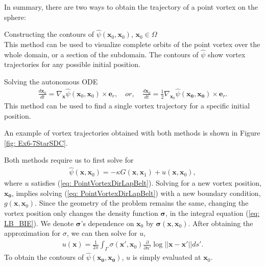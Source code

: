 \documentclass{sfuthesis}
\newcounter{qcounter}
\begin{document}
In summary, there are two ways to obtain the trajectory of a point vortex on the sphere: 
\begin{list}{\bfseries{} Method :~}{}
\item Constructing the contours of $\hat{\psi}(\mathbf{x}_0,\mathbf{x}_0)$, $\mathbf{x}_0 \in \Omega$ \\
This method can be used to visualize complete orbits of the point vortex over the whole domain, or a section of the subdomain. The contours of $\hat{\psi}$ show vortex trajectories for any possible initial position. 
\item Solving the autonomous ODE
\begin{align}
	\frac{d\mathbf{x}_0}{dt}={\nabla}_\mathbf{x}\hat{\psi}(\mathbf{x}_0,\mathbf{x}_0) \times {\mathbf{e}}_r, \quad or, \quad \frac{d\mathbf{x}_0}{dt}=\frac{1}{2}{\nabla}_{\mathbf{x}_0}\hat{\psi}(\mathbf{x_0},\mathbf{x_0}) \times {\mathbf{e}}_r. \label{eq: PointVortexIVP} 
\end{align}
This method can be used to find a single vortex trajectory for a specific initial position. 
\end{list}

An example of vortex trajectories obtained with both methods is shown in Figure \ref{fig: Ex6-7StarSDC}. 

Both methods require us to first solve for
\begin{align*}
	\hat{\psi}(\mathbf{x},\mathbf{x}_0)=-\kappa G(\mathbf{x}, \mathbf{x}_1)+u(\mathbf{x},\mathbf{x}_0), 
\end{align*}
where $u$ satisfies (\ref{eq: PointVortexDirLapBelt}). Solving for a new vortex position, $\mathbf{x_0}$, implies solving (\ref{eq: PointVortexDirLapBelt}) with a new boundary condition, $g(\mathbf{x}, \mathbf{x}_0)$. Since the geometry of the problem remains the same, changing the vortex position only changes the density function $\bm{\sigma}$, in the integral equation (\ref{eq: LB_BIE}). We denote $\bm{\sigma}$'s dependence on $\mathbf{x}_0$ by $\bm{\sigma}(\mathbf{x}, \mathbf{x}_0)$. 
After obtaining the approximation for ${\sigma}$, we can then solve for $u$, 
\begin{align}
	u(\mathbf{x})=\frac{1}{2\pi} \int_\Gamma \sigma(\mathbf{x}', \mathbf{x}_0) \frac{\partial}{\partial n'} \log {||\mathbf{x}-\mathbf{x}'||} ds'.  \label{eq: PointVortexDLPSoln} 
\end{align}
To obtain the contours of $\hat{\psi}(\mathbf{x_0},\mathbf{x_0})$, $u$ is simply evaluated at $\mathbf{x}_0$. 
\end{document}
